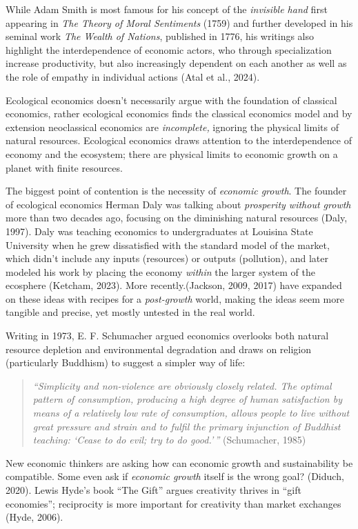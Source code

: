 \documentclass[
  12pt,
  letterpaper,
  DIV=11,
  numbers=noendperiod]{scrartcl}
\begin{document}
While Adam Smith is most famous for his concept of the \emph{invisible
hand} first appearing in \emph{The Theory of Moral Sentiments} (1759)
and further developed in his seminal work \emph{The Wealth of Nations},
published in 1776, his writings also highlight the interdependence of
economic actors, who through specialization increase productivity, but
also increasingly dependent on each another as well as the role of
empathy in individual actions (Atal et al., 2024).

Ecological economics doesn't necessarily argue with the foundation of
classical economics, rather ecological economics finds the classical
economics model and by extension neoclassical economics are
\emph{incomplete,} ignoring the physical limits of natural resources.
Ecological economics draws attention to the interdependence of economy
and the ecosystem; there are physical limits to economic growth on a
planet with finite resources.

The biggest point of contention is the necessity of \emph{economic
growth}. The founder of ecological economics Herman Daly was talking
about \emph{prosperity without growth} more than two decades ago,
focusing on the diminishing natural resources (Daly, 1997). Daly was
teaching economics to undergraduates at Louisina State University when
he grew dissatisfied with the standard model of the market, which didn't
include any inputs (resources) or outputs (pollution), and later modeled
his work by placing the economy \emph{within} the larger system of the
ecosphere (Ketcham, 2023). More recently.(Jackson, 2009, 2017) have
expanded on these ideas with recipes for a \emph{post-growth} world,
making the ideas seem more tangible and precise, yet mostly untested in
the real world.

Writing in 1973, E. F. Schumacher argued economics overlooks both
natural resource depletion and environmental degradation and draws on
religion (particularly Buddhism) to suggest a simpler way of life:

\begin{quote}
\emph{``Simplicity and non-violence are obviously closely related. The
optimal pattern of consumption, producing a high degree of human
satisfaction by means of a relatively low rate of consumption, allows
people to live without great pressure and strain and to fulfil the
primary injunction of Buddhist teaching: `Cease to do evil; try to do
good.'\,''} (Schumacher, 1985)
\end{quote}

New economic thinkers are asking how can economic growth and
sustainability be compatible. Some even ask if \emph{economic growth}
itself is the wrong goal? (Diduch, 2020). Lewis Hyde's book ``The Gift''
argues creativity thrives in ``gift economies''; reciprocity is more
important for creativity than market exchanges (Hyde, 2006).
\end{document}
